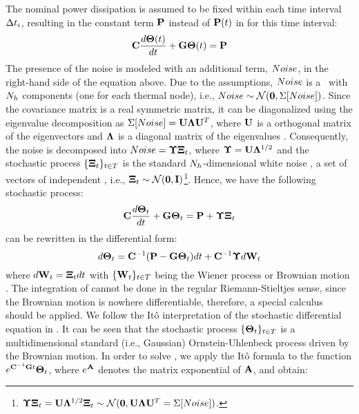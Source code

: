 The nominal power dissipation is assumed to be fixed within each time interval $\Delta t_i$, resulting in the constant term $\mathbf{P}$ instead of $\mathbf{P}(t)$ in  for this time interval:
\begin{equation} \equlabel{fourier-constant-power}
  \mcapacitance \frac{d\vtemperature(\time)}{d\time} + \mconductance \vtemperature(\time) = \vpower
\end{equation}
The presence of the noise is modeled with an additional term, $Noise$, in the right-hand side of the equation above. Due to the assumptions, $Noise$ is a \mnrv\ with $N_h$ components (one for each thermal node), i.e., $Noise \sim \mathcal{N}(\mathbf{0}, \Sigma[Noise])$. Since the covariance matrix is a real symmetric matrix, it can be diagonalized using the eigenvalue decomposition as $\Sigma[Noise] = \mathbf{U} \mathbf{\Lambda} \mathbf{U}^T$, where $\mathbf{U}$ is a orthogonal matrix of the eigenvectors and $\mathbf{\Lambda}$ is a diagonal matrix of the eigenvalues \cite{press2007}. Consequently, the noise is decomposed into $Noise = \mathbf{\Upsilon} \mathbf{\Xi}_t$, where $\mathbf{\Upsilon} = \mathbf{U} \mathbf{\Lambda}^{1/2}$ and the stochastic process $\{ \mathbf{\Xi}_t \}_{t \in T}$ is the standard $N_h$-dimensional white noise \cite{oksendal2003}, a set of vectors of independent \snrvs, i.e., $\mathbf{\Xi}_t \sim \mathcal{N}(\mathbf{0}, \mathbf{I})$\footnote{$\mathbf{\Upsilon} \mathbf{\Xi}_t = \mathbf{U} \mathbf{\Lambda}^{1/2} \mathbf{\Xi}_t \sim \mathcal{N}(\mathbf{0}, \mathbf{U} \mathbf{\Lambda} \mathbf{U}^T = \Sigma[Noise])$.}. Hence, we have the following stochastic process:
\begin{equation} \equlabel{fourier-noise}
  \mcapacitance \frac{d\vtemperature_\time}{d\time} + \mconductance \vtemperature_\time = \vpower + \mnoisedeviation \vstdnormal_\time
\end{equation}
 can be rewritten in the differential form:
\begin{equation} \equlabel{fourier-wiener}
  d\vtemperature_\time = \mcapacitance^{-1} (\vpower - \mconductance \vtemperature_\time)d\time + \mcapacitance^{-1} \mnoisedeviation d\m{W}_\time
\end{equation}
where $d\mathbf{W}_t = \mathbf{\Xi}_t dt$ with $\{ \mathbf{W}_t \}_{t \in T}$ being the Wiener process or Brownian motion \cite{oksendal2003}. The integration of  cannot be done in the regular Riemann-Stieltjes sense, since the Brownian motion is nowhere differentiable, therefore, a special calculus should be applied. We follow the It\^{o} interpretation \cite{oksendal2003} of the stochastic differential equation in . It can be seen that the stochastic process $\{ \mathbf{\Theta}_t \}_{t \in T}$ is a multidimensional standard (i.e., Gaussian) Ornstein-Uhlenbeck process \cite{kloeden1992} driven by the Brownian motion. In order to solve , we apply the It\^{o} formula \cite{oksendal2003} to the function $e^{ \mathbf{C}^{-1} \mathbf{G} t} \mathbf{\Theta}_t$, where $e^{\mathbf{A}}$ denotes the matrix exponential of $\mathbf{A}$, and obtain:
